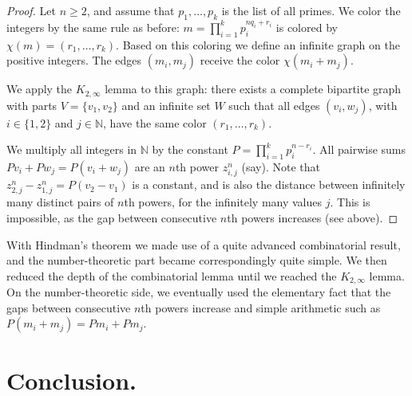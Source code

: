 \documentclass[12pt]{article}
\theoremstyle{theorem}
\theoremstyle{definition}
\newcommand{\N}{\mathbb N}
\begin{document}
\begin{proof}
Let $n\geq 2$, and assume that $p_1, \ldots , p_k$ is the list of all primes.
 We color the integers by the same rule as before:
$m= \prod_{i=1}^k p_i^{n q_i +r_i}$ is colored by $\chi(m)=(r_1, \ldots ,r_k)$.
Based on this coloring we define an infinite graph on the positive integers. 
The edges $(m_i,m_j)$ receive the color $\chi(m_i+m_j)$.

We apply the $K_{2,\infty}$ lemma to this graph: 
there exists a complete bipartite graph with parts $V=\{v_1,v_2\}$ and an
infinite set $W$
 such that all
 edges $(v_i,w_j)$, with $i\in \{1,2\}$ and $j \in \N$, have the same color
 $(r_1, \ldots ,r_k)$.

We multiply all integers in $\N$ by the constant
$P=\prod_{i=1}^k p_i^{n-r_i}$.
All pairwise sums
$Pv_i+Pw_j=P(v_i+w_j)$ are an $n$th power $z_{i,j}^n$ (say). Note
that $z_{2,j}^n-z_{1,j}^n=P(v_2-v_1)$ is a constant, 
and is also the distance between infinitely many distinct
pairs of $n$th powers, for the infinitely many values $j$.
This is impossible, as
the gap between consecutive $n$th powers increases (see above).
\end{proof}



With Hindman's theorem we
made use of a quite advanced combinatorial result, 
and the number-theoretic part became correspondingly quite simple.
We then reduced the depth of the combinatorial lemma until we reached 
the $K_{2, \infty}$ lemma.
On the number-theoretic side, we eventually used the elementary
fact that the gaps between consecutive $n$th powers increase and simple
arithmetic such as $P(m_i+m_j)=Pm_i+Pm_j$.

\section{Conclusion.}
 
\end{document}
